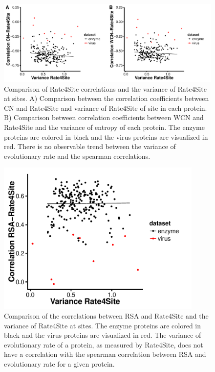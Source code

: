\documentclass[12pt]{article}
\begin{document}
        \begin{figure}[H]
            \centerline{\includegraphics[width=7.5in]{rate_cor.pdf}}     
            \caption{Comparison of Rate4Site correlations and the variance of Rate4Site at sites. A) Comparison between the correlation coefficients between CN and Rate4Site and variance of Rate4Site of site in each protein. B) Comparison between correlation coefficients between WCN and Rate4Site and the variance of entropy of each protein. The enzyme proteins are colored in black and the virus proteins are visualized in red. There is no observable trend between the variance of evolutionary rate and the spearman correlations. }
            \label{fig:var_rate_cor}
    \end{figure}
        
            \begin{figure}[H]
            \centerline{\includegraphics[width=4in]{var_rate_rsa_cor.pdf}}     
            \caption{Comparison of the correlations between RSA and Rate4Site and the variance of Rate4Site at sites. The enzyme proteins are colored in black and the virus proteins are visualized in red. The variance of evolutionary rate of a protein, as measured by Rate4Site, does not have a correlation with the spearman correlation between RSA and evolutionary rate for a given protein.}
            \label{fig:var_rate_rsa_cor}
    \end{figure}
    
\end{document}
